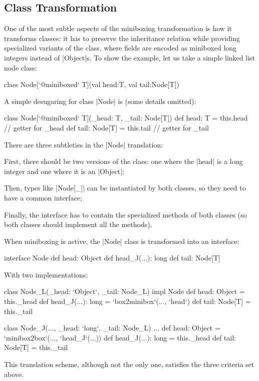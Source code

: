 \subsection{Class Transformation}

One of the most subtle aspects of the miniboxing transformation is how it transforms classes: it has to preserve the inheritance relation while providing specialized variants of the class, where fields are encoded as miniboxed long integers instead of |Object|s. To show the example, let us take a simple linked list node class:

\begin{lstlisting-nobreak}
 class Node[`@miniboxed` T](val head:T, val tail:Node[T])
\end{lstlisting-nobreak}

A simple desugaring for class |Node| is (some details omitted):

\begin{lstlisting-nobreak}
 class Node[`@miniboxed` T](_head: T, _tail: Node[T]) {
   def head: T = this.head                 // getter for _head
   def tail: Node[T] = this.tail // getter for _tail
 }
\end{lstlisting-nobreak}

There are three subtleties in the |Node| translation:
\begin{compactitem}
  \item First, there should be two versions of the class: one where the |head| is a long integer and one where it is an |Object|;
  \item Then, types like |Node[_]| can be instantiated by both classes, so they need to have a common interface;
  \item Finally, the interface has to contain the specialized methods of both classes (so both classes should implement all the methods).
\end{compactitem}

When miniboxing is active, the |Node| class is transformed into an interface:

\begin{lstlisting-nobreak}
 interface Node {
   def head: Object
   def head_J(...): long
   def tail: Node[T]
 }
\end{lstlisting-nobreak}

With two implementations:

\begin{lstlisting-nobreak}
 class Node_L(_head: `Object`, _tail: Node_L) impl Node {
   def head: Object = this._head
   def head_J(...): long = `box2minibox`(..., `head`)
   def tail: Node[T] = this._tail
 }

 class Node_J(..., _head: `long`, _tail: Node_L) ... {
   def head: Object = `minibox2box`(..., `head_J`(...))
   def head_J(...): long = this._head
   def tail: Node[T] = this._tail
 }
\end{lstlisting-nobreak}

This translation scheme, although not the only one, satisfies the three criteria set above.
